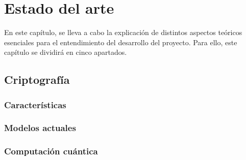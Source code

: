 %
%
%
% 
%
%
%
%

\chapter{Estado del arte}\label{cha:estado-arte}

En este capítulo, se lleva a cabo la explicación de distintos aspectos teóricos esenciales para el entendimiento del desarrollo del proyecto.
Para ello, este capítulo se dividirá en cinco apartados.

\section{Criptografía}\label{sec:criptografia}


\subsection{Características}\label{subsec:caracteristicas}


\subsection{Modelos actuales}\label{subsec:mod_act}


\subsection{Computación cuántica}\label{subsec:cuantica}


